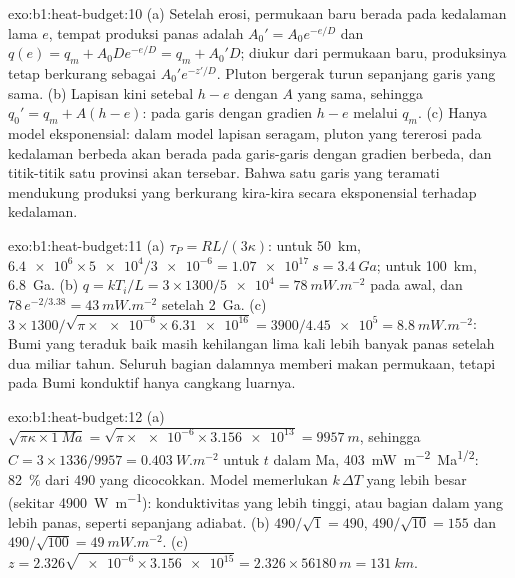 \begin{solution}{exo:b1:heat-budget:10}
(a) Setelah erosi, permukaan baru berada pada kedalaman lama $e$, tempat produksi panas
adalah $A_0' = A_0e^{-e/D}$ dan  $q(e) = q_m +
A_0De^{-e/D} = q_m + A_0'D$; diukur dari permukaan baru, produksinya
tetap berkurang sebagai $A_0'e^{-z'/D}$. Pluton bergerak turun sepanjang garis yang sama.
(b) Lapisan kini setebal $h - e$ dengan $A$ yang sama, sehingga $q_0' = q_m + A(h - e)$:
pada garis dengan gradien $h - e$ melalui $q_m$. (c) Hanya model eksponensial: dalam
model lapisan seragam, pluton yang tererosi pada kedalaman berbeda akan berada pada garis-garis dengan
gradien berbeda, dan titik-titik satu provinsi akan tersebar. Bahwa satu garis
yang teramati mendukung produksi yang berkurang kira-kira secara eksponensial terhadap
kedalaman.
\end{solution}

\begin{solution}{exo:b1:heat-budget:11}
(a) $\tau_P = RL/(3\kappa)$: untuk \qty{50}{km}, $\num{6.4e6}\times\num{5e4}/\num{3e-6}
= \qty{1.07e17}{s} = \qty{3.4}{Ga}$; untuk \qty{100}{km}, \qty{6.8}{Ga}.
(b) $q = kT_i/L = 3\times1300/\num{5e4} = \qty{78}{mW.m^{-2}}$ pada awal,
dan $78\,e^{-2/3.38} = \qty{43}{mW.m^{-2}}$ setelah \qty{2}{Ga}. (c)
$3\times1300/\sqrt{\pi\times\num{e-6}\times\num{6.31e16}} = 3900/\num{4.45e5} =
\qty{8.8}{mW.m^{-2}}$: Bumi yang teraduk baik masih kehilangan lima kali lebih banyak panas
setelah dua miliar tahun. Seluruh bagian dalamnya memberi makan permukaan, tetapi pada
Bumi konduktif hanya cangkang luarnya.
\end{solution}

\begin{solution}{exo:b1:heat-budget:12}
(a) $\sqrt{\pi\kappa\times\qty{1}{Ma}} = \sqrt{\pi\times\num{e-6}\times\num{3.156e13}}
= \qty{9957}{m}$, sehingga $C = 3\times1336/9957 = \qty{0.403}{W.m^{-2}}$ untuk
$t$ dalam Ma, \qty{403}{mW.m^{-2}.Ma^{1/2}}: \qty{82}{\percent} dari
490 yang dicocokkan. Model memerlukan $k\,\Delta T$ yang lebih besar (sekitar \qty{4900}{W.m^{-1}}):
konduktivitas  yang lebih tinggi, atau bagian dalam yang lebih panas, seperti sepanjang adiabat.
(b) $490/\sqrt1 = 490$, $490/\sqrt{10} = 155$ dan $490/\sqrt{100} =
\qty{49}{mW.m^{-2}}$. (c) $z = 2.326\sqrt{\num{e-6}\times\num{3.156e15}} =
2.326\times\qty{56180}{m} = \qty{131}{km}$.
\end{solution}

